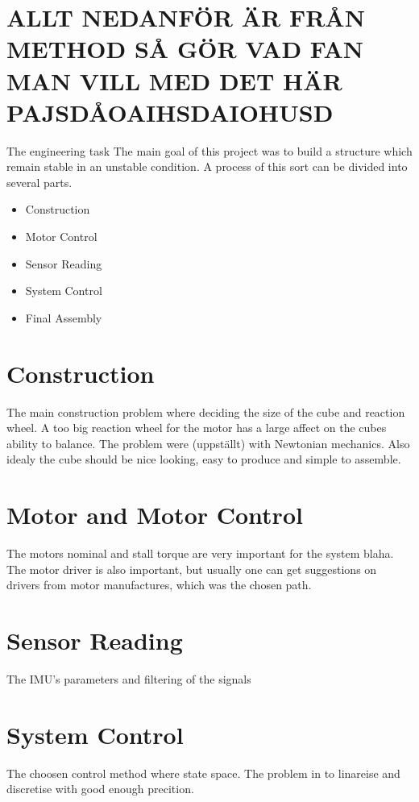 \documentclass[a4paper,11pt]{kth-mag}
\begin{document}
\section{ALLT NEDANFÖR ÄR FRÅN METHOD SÅ GÖR VAD FAN MAN VILL MED DET HÄR PAJSDÅOAIHSDAIOHUSD}


The engineering task The main goal of this project was to build a structure which remain stable in an unstable condition. A process of this sort can be divided into several parts. 
\begin{itemize}
\item Construction
\item Motor Control
\item Sensor Reading
\item System Control
\item Final Assembly
\end{itemize}

\section{Construction}
The main construction problem where deciding the size of the cube and reaction wheel. A too big reaction wheel for the motor has a large affect on the cubes ability to balance. The problem were (uppställt) with Newtonian mechanics.
Also idealy the cube should be nice looking, easy to produce and simple to assemble. 
 
\section{Motor and Motor Control}
The motors nominal and stall torque are very important for the system blaha. The motor driver is also important, but usually one can get suggestions on drivers from motor manufactures, which was the chosen path.
  
\section{Sensor Reading}
The IMU's parameters and filtering of the signals

\section{System Control}
The choosen control method where state space. The problem in to linareise and discretise with good enough precition.
\end{document}
